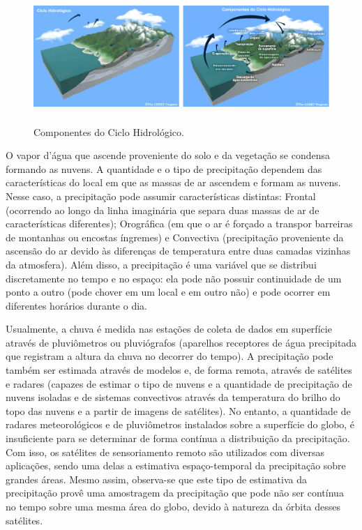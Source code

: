 \begin{figure}
\centering
\includegraphics[height=5cm]{./figs/fig01.png}
\caption{Componentes do Ciclo Hidrológico.}
\label{fig01}
\end{figure}

O vapor d'água que ascende proveniente do solo e da vegetação se condensa formando as nuvens. A quantidade e o tipo de precipitação dependem das características do local em que as massas de ar ascendem e formam as nuvens. Nesse caso, a precipitação pode assumir características distintas: Frontal (ocorrendo ao longo da linha imaginária que separa duas massas de ar de características diferentes); Orográfica (em que o ar é forçado a transpor barreiras de montanhas ou encostas íngremes) e Convectiva (precipitação proveniente da ascensão do ar devido às diferenças de temperatura entre duas camadas vizinhas da atmosfera). Além disso, a precipitação é uma variável que se distribui discretamente no tempo e no espaço: ela pode não possuir continuidade de um ponto a outro (pode chover em um local e em outro não) e pode ocorrer em diferentes horários durante o dia.

Usualmente, a chuva é medida nas estações de coleta de dados em superfície através de pluviômetros ou pluviógrafos (aparelhos receptores de água precipitada que registram a altura da chuva no decorrer do tempo). A precipitação pode também ser estimada através de modelos e, de forma remota, através de satélites e radares (capazes de estimar o tipo de nuvens e a quantidade de precipitação de nuvens isoladas e de sistemas convectivos através da temperatura do brilho do topo das nuvens e a partir de imagens de satélites). No entanto, a quantidade de radares meteorológicos e de pluviômetros instalados sobre a superfície do globo, é insuficiente para se determinar de forma contínua a distribuição da precipitação. Com isso, os satélites de sensoriamento remoto são utilizados com diversas aplicações, sendo uma delas a estimativa espaço-temporal da precipitação sobre grandes áreas. Mesmo assim, observa-se que este tipo de estimativa da precipitação provê uma amostragem da precipitação que pode não ser contínua no tempo sobre uma mesma área do globo, devido à natureza da órbita desses satélites. 


